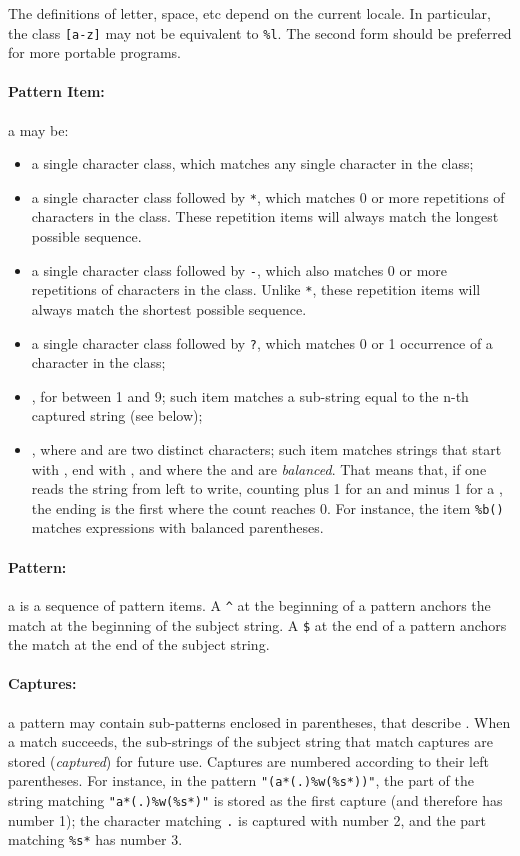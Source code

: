 The definitions of letter, space, etc depend on the current locale.
In particular, the class \verb|[a-z]| may not be equivalent to \verb|%l|.
The second form should be preferred for more portable programs.

\paragraph{Pattern Item:}
a  may be:
\begin{itemize}
\item
a single character class,
which matches any single character in the class;
\item
a single character class followed by \verb|*|,
which matches 0 or more repetitions of characters in the class.
These repetition items will always match the longest possible sequence.
\item
a single character class followed by \verb|-|,
which also matches 0 or more repetitions of characters in the class.
Unlike \verb|*|,
these repetition items will always match the shortest possible sequence.
\item
a single character class followed by \verb|?|,
which matches 0 or 1 occurrence of a character in the class;
\item
{}, for  between 1 and 9;
such item matches a sub-string equal to the n-th captured string
(see below);
\item
{}, where  and  are two distinct characters;
such item matches strings that start with , end with ,
and where the  and  are \emph{balanced}.
That means that, if one reads the string from left to write,
counting plus 1 for an  and minus 1 for a ,
the ending  is the first where the count reaches 0.
For instance, the item \verb|%b()| matches expressions with
balanced parentheses.
\end{itemize}

\paragraph{Pattern:}
a  is a sequence of pattern items.
A \verb|^| at the beginning of a pattern anchors the match at the
beginning of the subject string.
A \verb|$| at the end of a pattern anchors the match at the
end of the subject string.

\paragraph{Captures:}
a pattern may contain sub-patterns enclosed in parentheses,
that describe .
When a match succeeds, the sub-strings of the subject string
that match captures are stored (\emph{captured}) for future use.
Captures are numbered according to their left parentheses.
For instance, in the pattern \verb|"(a*(.)%w(%s*))"|,
the part of the string matching \verb|"a*(.)%w(%s*)"| is
stored as the first capture (and therefore has number 1);
the character matching \verb|.| is captured with number 2,
and the part matching \verb|%s*| has number 3.


